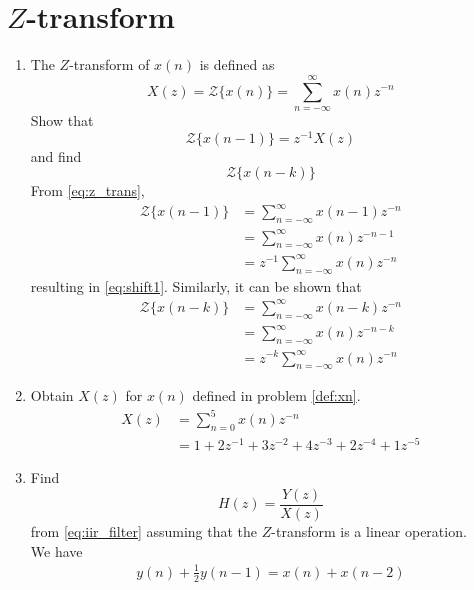 \documentclass[journal,12pt,twocolumn]{IEEEtran}
\renewcommand\thesection{\arabic{section}}
\begin{document}
\section{$Z$-transform}
\begin{enumerate}[label=\thesection.\arabic*]
\item The $Z$-transform of $x(n)$ is defined as
%
\begin{equation}
\label{eq:z_trans}
X(z)={\mathcal {Z}}\{x(n)\}=\sum _{n=-\infty }^{\infty }x(n)z^{-n}
\end{equation}
%
Show that
\begin{equation}
\label{eq:shift1}
{\mathcal {Z}}\{x(n-1)\} = z^{-1}X(z)
\end{equation}
and find
\begin{equation}
	{\mathcal {Z}}\{x(n-k)\} 
\end{equation}
\solution From \eqref{eq:z_trans},
\begin{align}
{\mathcal {Z}}\{x(n-1)\} &=\sum _{n=-\infty }^{\infty }x(n-1)z^{-n}
\\
&=\sum _{n=-\infty }^{\infty }x(n)z^{-n-1} \\
&=z^{-1}\sum _{n=-\infty }^{\infty }x(n)z^{-n}
\end{align}
resulting in \eqref{eq:shift1}. Similarly, it can be shown that
%
\begin{align}
  {\mathcal {Z}}\{x(n-k)\} &=\sum _{n=-\infty }^{\infty }x(n-k)z^{-n}
  \\
  &=\sum _{n=-\infty }^{\infty }x(n)z^{-n-k} \\
  &=z^{-k}\sum _{n=-\infty }^{\infty }x(n)z^{-n}
  \label{eq:z_trans_shift}
  \end{align}
\item Obtain $X(z)$ for $x(n)$ defined in problem 
	\ref{def:xn}.
\solution \\
\begin{align}
  X(z)&=\sum _{n=0}^{5}x(n)z^{-n}\\
  &= 1 + 2z^{-1} + 3z^{-2} + 4z^{-3} + 2z^{-4} + 1z^{-5}
\end{align}
\item Find
%
\begin{equation}
H(z) = \frac{Y(z)}{X(z)}
\end{equation}
%
from  \eqref{eq:iir_filter} assuming that the $Z$-transform is a linear operation.
\\
\solution We have
\begin{align}
  y(n) + \frac{1}{2}y(n-1) = x(n) + x(n-2)
\end{align} 

\end{enumerate}
\end{document}
